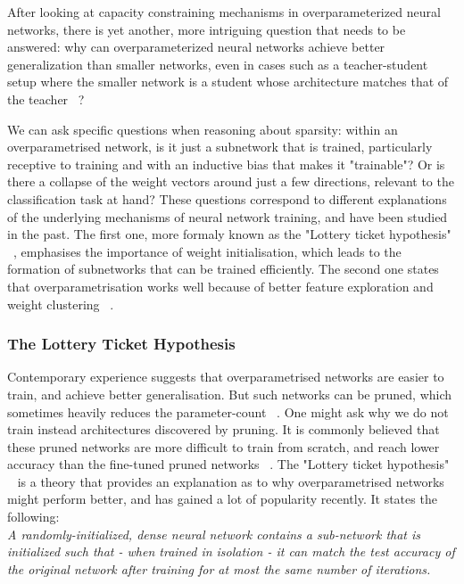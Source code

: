 After looking at capacity constraining mechanisms in overparameterized neural networks, there is yet another, more intriguing question that needs to be answered: why can overparameterized neural networks achieve better generalization than smaller networks, even in cases such as a teacher-student setup where the smaller network is a student whose architecture matches that of the teacher ~\autocite{tian2019luck}?

We can ask specific questions when reasoning about sparsity: within an overparametrised network, is it just a subnetwork that is trained, particularly receptive to training and with an inductive bias that makes it "trainable"? Or is there a collapse of the weight vectors around just a few directions, relevant to the classification task at hand? These questions correspond to different explanations of the underlying mechanisms of neural network training, and have been studied in the past. The first one, more formaly known as the "Lottery ticket hypothesis" ~\autocite{frankle2018lottery}, emphasises the importance of weight initialisation, which leads to the formation of subnetworks that can be trained efficiently. The second one states that overparametrisation works well because of better feature exploration and weight clustering ~\autocite{brutzkus2019larger}.

\subsubsection*{The Lottery Ticket Hypothesis}
Contemporary experience suggests that overparametrised networks are easier to train, and achieve better generalisation. But such networks can be pruned, which sometimes heavily reduces the parameter-count ~\autocite{han2015learning}. One might ask why we do not train instead architectures discovered by pruning. It is commonly believed that these pruned networks are more difficult to train from scratch, and reach lower accuracy than the fine-tuned pruned networks ~\autocite{li2016pruning}. The "Lottery ticket hypothesis" ~\autocite{frankle2018lottery} is a theory that provides an explanation as to why overparametrised networks might perform better, and has gained a lot of popularity recently. It states the following: \\

\noindent
\textit{A randomly-initialized, dense neural network contains a sub-network that is initialized such that - when trained in isolation - it can match the test accuracy of the original network after training for at most the same number of iterations.} \\

